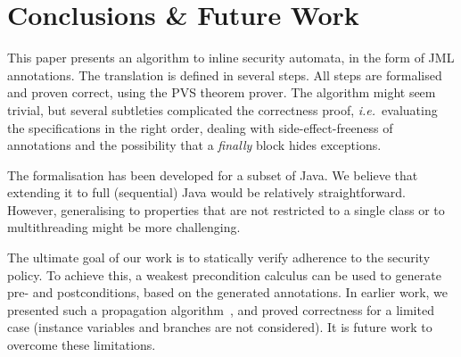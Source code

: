 \section{Conclusions \& Future Work }\label{SecConcl}

This paper presents an algorithm to inline security automata, in the
form of JML annotations. The translation is defined in several
steps. All steps are formalised and proven correct, using the PVS
theorem prover. The algorithm might seem trivial, but several
subtleties complicated the correctness proof, \emph{i.e.}~evaluating
the specifications in the right order, dealing with
side-effect-freeness of annotations and the possibility that a
\emph{finally} block hides exceptions. 


The formalisation has been developed for a subset of Java. We believe
that extending it to full (sequential) Java would be relatively
straightforward. However, generalising to properties that are not
restricted to a single class or to multithreading might be more
challenging.

The ultimate goal of our work is to statically verify adherence to the
security policy. To achieve this, a weakest precondition calculus can
be used to generate pre- and postconditions, based on the generated
\Set annotations. In earlier work, we presented such a
propagation algorithm~\cite{PavlovaBBHL04}, and proved correctness for
a limited case (instance variables and branches are not
considered). It is future work to overcome these limitations.
